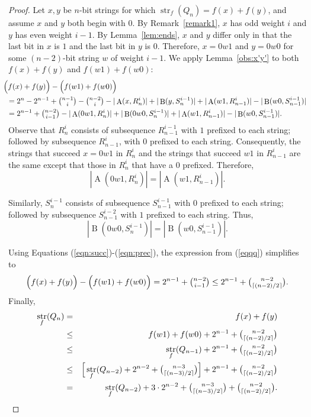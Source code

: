 \documentclass[12pt]{article}
\DeclareMathOperator{\str}{str}
\DeclareMathOperator{\Succ}{A}
\DeclareMathOperator{\Prec}{B}
\begin{document}
\begin{proof} Let $x,y$ be $n$-bit strings for which $\str_f(Q_{n}) = f(x)+f(y)$, and assume $x$ and $y$ both begin with $0$.  By Remark~\ref{remark1}, $x$ has odd weight $i$ and $y$ has even weight $i-1$.  By Lemma~\ref{lem:ends}, $x$ and $y$ differ only in that the last bit in $x$ is $1$ and the last bit in $y$ is $0$.  Therefore, $x = 0w1$ and $y=0w0$ for some $(n-2)$-bit string $w$ of weight $i-1$. We apply Lemma~\ref{obs:x'y'} to both $f(x)+f(y)$ and $f(w1)+f(w0)$:   
\begin{multline}\label{eqqq} \hspace{-0.1in}\Big(f(x) + f(y)\Big) - \Big(f(w1)+f(w0)\Big) \hfill  \\
=2^{n}-2^{n-1}+\tbinom{n-1}{i}-\tbinom{n-2}{i}-|\Succ(x,R_{n}^i)|+|\Prec(y,S_{n}^{i-1})|+|\Succ(w1,R_{n-1}^i)|-|\Prec(w0,S_{n-1}^{i-1})| \hfill \\
=2^{n-1}+\tbinom{n-2}{i-1}-|\Succ(0w1,R_{n}^i)|+|\Prec(0w0,S_{n}^{i-1})|+|\Succ(w1,R_{n-1}^i)|-|\Prec(w0,S_{n-1}^{i-1})|. \hfill
\end{multline}
Observe that $R_{n}^i$ consists of subsequence $R_{n-1}^{i-1}$ with $1$ prefixed to each string; followed by subsequence $R_{n-1}^{i}$, with $0$ prefixed to each string.  Consequently, the strings that succeed $x=0w1$ in $R_{n}^i$ and the strings that succeed $w1$ in $R_{n-1}^i$ are the same except that those in $R_{n}^i$ that have a $0$ prefixed.  Therefore, \begin{equation}\label{eqn:succ}|\Succ(0w1,R_{n}^i)|=|\Succ(w1,R_{n-1}^i)|.\end{equation}

Similarly, $S_{n}^{i-1}$ consists of subsequence $S_{n-1}^{i-1}$ with 0 prefixed to each string; followed by subsequence $S_{n-1}^{i-2}$ with $1$ prefixed to each string.  Thus, \begin{equation}\label{eqn:prec}|\Prec(0w0,S_{n}^{i-1})|=|\Prec(w0,S_{n-1}^{i-1})|.\end{equation}

Using Equations (\ref{eqn:succ})-(\ref{eqn:prec}), the expression from (\ref{eqqq}) simplifies to $$\Big(f(x) + f(y)\Big) - \Big(f(w1)+f(w0)\Big) = 2^{n-1}+\tbinom{n-2}{i-1} \leq 2^{n-1} + \tbinom{n-2}{\lceil (n-2)/2 \rceil}.$$   Finally, \begin{eqnarray}\str_f(Q_{n}) &=& f(x)+f(y)\nonumber \\ &\leq& f(w1)+f(w0)+2^{n-1}+\tbinom{n-2}{\lceil (n-2)/2 \rceil}\nonumber \\ &\leq& \str_f(Q_{n-1})+2^{n-1}+\tbinom{n-2}{\lceil (n-2)/2\rceil} \label{YA}\\
&\leq& \Big[\str_f(Q_{n-2})+2^{n-2}+\tbinom{n-3}{\lceil (n-3)/2 \rceil}\Big] +2^{n-1}+\tbinom{n-2}{\lceil (n-2)/2\rceil}\nonumber \\
&=& \str_f(Q_{n-2}) + 3 \cdot 2^{n-2}+\tbinom{n-3}{\lceil(n-3)/2 \rceil}+\tbinom{n-2}{\lceil (n-2)/2\rceil}.\nonumber
\end{eqnarray}\end{proof}
\end{document}
